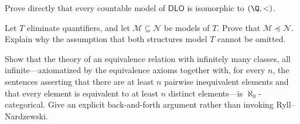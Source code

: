 \begin{exercise}
\label{ex:qe-categoricity-01}
Prove directly that every countable model of \(\mathsf{DLO}\) is isomorphic to
\((\Q,<)\).
\end{exercise}

\begin{exercise}
\label{ex:qe-categoricity-02}
Let \(T\) eliminate quantifiers, and let \(\mathcal M\subseteq\mathcal N\) be
models of \(T\).  Prove that \(\mathcal M\preccurlyeq\mathcal N\).  Explain
why the assumption that both structures model \(T\) cannot be omitted.
\end{exercise}

\begin{exercise}
\label{ex:qe-categoricity-03}
\label{ex:back-and-forth-equivalence}
Show that the theory of an equivalence relation with infinitely many
classes, all infinite---axiomatized by the equivalence axioms together with,
for every \(n\), the sentences asserting that there are at least \(n\)
pairwise inequivalent elements and that every element is equivalent to at
least \(n\) distinct elements---is
\(\aleph_0\)-categorical.  Give an explicit back-and-forth argument
rather than invoking Ryll--Nardzewski.
\end{exercise}

